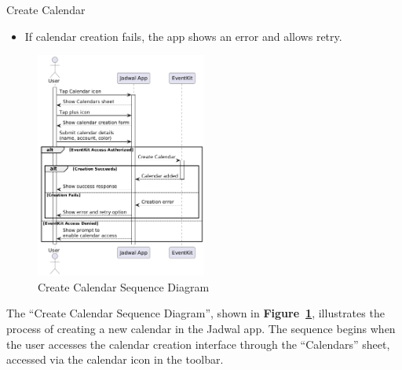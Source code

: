 \begin{usecase}{Create Calendar}
{\begin{itemize}
      \item If calendar creation fails, the app shows an error and allows retry.
    \end{itemize}
  }
\end{usecase}

\begin{figure}[!h]
  \centering
  \includegraphics[width=0.5\textwidth]{images/docs/diagrams/sequence-diagrams/all-sequence-diagrams/Create Calendar.png}
  \caption{Create Calendar Sequence Diagram}
  \label{fig:seq/create-calendar}
\end{figure}

The ``Create Calendar Sequence Diagram'', shown in \textbf{Figure~\ref{fig:seq/create-calendar}}, illustrates the process of creating a new calendar in the Jadwal app. The sequence begins when the user accesses the calendar creation interface through the ``Calendars'' sheet, accessed via the calendar icon in the toolbar.

